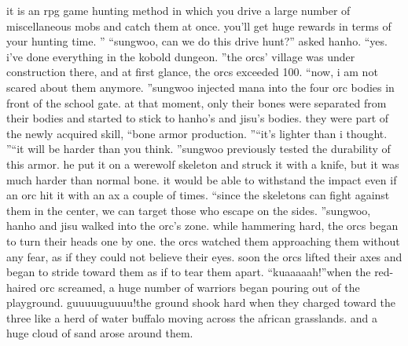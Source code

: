 it is an rpg game hunting method in which you drive a large number of miscellaneous mobs and catch them at once.
 you’ll get huge rewards in terms of your hunting time.
”
“sungwoo, can we do this drive hunt?” asked hanho.
“yes.
 i’ve done everything in the kobold dungeon.
”the orcs’ village was under construction there, and at first glance, the orcs exceeded 100.
“now, i am not scared about them anymore.
”sungwoo injected mana into the four orc bodies in front of the school gate.
 at that moment, only their bones were separated from their bodies and started to stick to hanho’s and jisu’s bodies.
they were part of the newly acquired skill, “bone armor production.
”“it’s lighter than i thought.
”“it will be harder than you think.
”sungwoo previously tested the durability of this armor.
 he put it on a werewolf skeleton and struck it with a knife, but it was much harder than normal bone.
it would be able to withstand the impact even if an orc hit it with an ax a couple of times.
“since the skeletons can fight against them in the center, we can target those who escape on the sides.
”sungwoo, hanho and jisu walked into the orc’s zone.
while hammering hard, the orcs began to turn their heads one by one.
 the orcs watched them approaching them without any fear, as if they could not believe their eyes.
soon the orcs lifted their axes and began to stride toward them as if to tear them apart.
“kuaaaaah!”when the red-haired orc screamed, a huge number of warriors began pouring out of the playground.
guuuuuguuuu!the ground shook hard when they charged toward the three like a herd of water buffalo moving across the african grasslands.
 and a huge cloud of sand arose around them.

